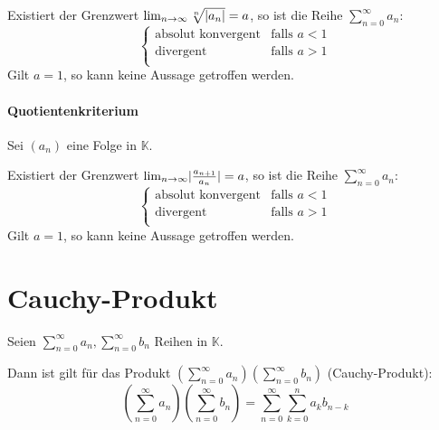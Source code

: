             Existiert der Grenzwert $ \lim_{n \to \infty} \sqrt[n]{\lvert a _ n \rvert} = a $, so ist die Reihe $ \sum _ { n = 0 } ^ \infty a _ n $:
            \begin{equation}
                 \begin{cases}
                    \text{absolut konvergent} & \text{falls } a < 1 \\
                    \text{divergent}          & \text{falls } a > 1 \\
                 \end{cases}
            \end{equation}
            \indent Gilt $ a = 1 $, so kann keine Aussage getroffen werden.

        \paragraph{Quotientenkriterium}
            Sei $ (a _ n) $ eine Folge in $ \mathbb{K} $.

            Existiert der Grenzwert $ \lim_{n \to \infty} \lvert \frac{a _ { n + 1 }}{a _ n} \rvert = a $, so ist die Reihe $ \sum _ { n = 0 } ^ \infty a _ n $:
            \begin{equation*}
                 \begin{cases}
                    \text{absolut konvergent} & \text{falls } a < 1 \\
                    \text{divergent}          & \text{falls } a > 1 \\
                 \end{cases}
            \end{equation*}
            \indent Gilt $ a = 1 $, so kann keine Aussage getroffen werden.

    \section{Cauchy-Produkt}
        Seien $ \sum _ { n = 0 } ^ { \infty } a _ n, \sum _ { n = 0 } ^ \infty b _ n $ Reihen in $ \mathbb{K} $.

        Dann ist gilt für das Produkt $ (\sum _ { n = 0 } ^ { \infty } a _ n) (\sum _ { n = 0 } ^ { \infty } b _ n) $ (Cauchy-Produkt):
        \begin{equation*}
            (\sum _ { n = 0 } ^ { \infty } a _ n) (\sum _ { n = 0 } ^ { \infty } b _ n) = \sum _ { n = 0 } ^ \infty \sum _ { k = 0 } ^ n a _ k b _ { n - k }
        \end{equation*}

